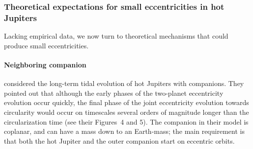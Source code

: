 \documentclass[12pt,twocolumn,tighten]{aastex62}
\begin{document}
\subsubsection{Theoretical expectations for small eccentricities in hot
Jupiters}

Lacking empirical data, we now turn to theoretical mechanisms that could
produce small eccentricities.

\paragraph{Neighboring companion}
\citet{mardling_long-term_2007} considered the long-term tidal evolution
of hot Jupiters with companions.  They pointed out that although the
early phases of the two-planet eccentricity evolution occur
quickly, the final phase of the joint eccentricity evolution towards
circularity would occur on timescales several orders of magnitude
longer than the circularization time (see their Figures~4 and 5).  The
companion in their model is coplanar, and can have a mass down to an
Earth-mass; the main requirement is that both the hot Jupiter and the
outer companion start on eccentric orbits.
\end{document}

